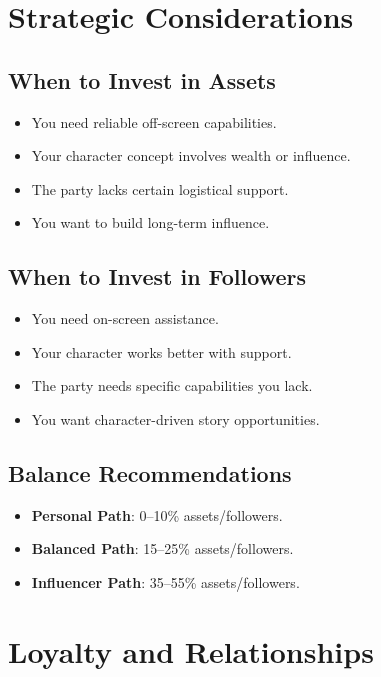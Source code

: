 \section{Strategic Considerations}

\subsection*{When to Invest in Assets}
\begin{itemize}
\item You need reliable off-screen capabilities.
\item Your character concept involves wealth or influence.
\item The party lacks certain logistical support.
\item You want to build long-term influence.
\end{itemize}

\subsection*{When to Invest in Followers}
\begin{itemize}
\item You need on-screen assistance.
\item Your character works better with support.
\item The party needs specific capabilities you lack.
\item You want character-driven story opportunities.
\end{itemize}

\subsection*{Balance Recommendations}
\begin{itemize}
\item \textbf{Personal Path}: 0--10\% assets/followers.
\item \textbf{Balanced Path}: 15--25\% assets/followers.
\item \textbf{Influencer Path}: 35--55\% assets/followers.
\end{itemize}

\section{Loyalty and Relationships}

